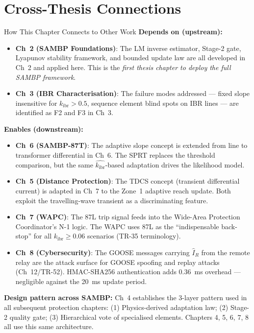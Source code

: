 \documentclass[12pt,a4paper]{article}
\newcommand{\kibr}{k_\mathrm{ibr}}
\begin{document}
\section{Cross-Thesis Connections}

\begin{archbox}{How This Chapter Connects to Other Work}
\textbf{Depends on (upstream):}
\begin{itemize}[nosep]
  \item \textbf{Ch~2 (SAMBP Foundations)}: The LM inverse estimator, Stage-2 gate, Lyapunov stability framework, and bounded update law are all developed in Ch~2 and applied here. This is the \emph{first thesis chapter to deploy the full SAMBP framework}.
  \item \textbf{Ch~3 (IBR Characterisation)}: The failure modes addressed --- fixed slope insensitive for $\kibr > 0.5$, sequence element blind spots on IBR lines --- are identified as F2 and F3 in Ch~3.
\end{itemize}

\textbf{Enables (downstream):}
\begin{itemize}[nosep]
  \item \textbf{Ch~6 (SAMBP-87T)}: The adaptive slope concept is extended from line to transformer differential in Ch~6. The SPRT replaces the threshold comparison, but the same $\hat{\kibr}$-based adaptation drives the likelihood model.
  \item \textbf{Ch~5 (Distance Protection)}: The TDCS concept (transient differential current) is adapted in Ch~7 to the Zone~1 adaptive reach update. Both exploit the travelling-wave transient as a discriminating feature.
  \item \textbf{Ch~7 (WAPC)}: The 87L trip signal feeds into the Wide-Area Protection Coordinator's N-1 logic. The WAPC uses 87L as the ``indispensable back-stop'' for all $\kibr \geq 0.06$ scenarios (TR-35 terminology).
  \item \textbf{Ch~8 (Cybersecurity)}: The GOOSE messages carrying $\hat{I}_R$ from the remote relay are the attack surface for GOOSE spoofing and replay attacks (Ch~12/TR-52). HMAC-SHA256 authentication adds 0.36~ms overhead --- negligible against the 20~ms update period.
\end{itemize}

\textbf{Design pattern across SAMBP:} Ch~4 establishes the 3-layer pattern used in all subsequent protection chapters: (1) Physics-derived adaptation law; (2) Stage-2 quality gate; (3) Hierarchical vote of specialised elements. Chapters 4, 5, 6, 7, 8 all use this same architecture.
\end{archbox}
\end{document}
